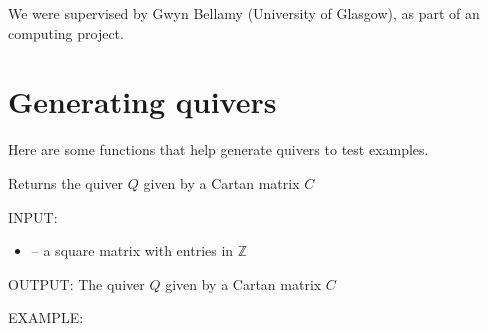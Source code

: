 \documentclass[letterpaper,10pt,english]{sphinxmanual}
\begin{document}
\sphinxAtStartPar
We were supervised by Gwyn Bellamy (University of Glasgow), as part of an  computing project.


\chapter{Generating quivers}
\label{\detokenize{index:generating-quivers}}
\sphinxAtStartPar
Here are some functions that help generate quivers to test examples.

\begin{fulllineitems}
\label{\detokenize{index:quivercombinatorics.quiver_from_cartan_matrix}}
\pysigstartsignatures
\pysiglinewithargsret
{}
{}
{}
\pysigstopsignatures
\sphinxAtStartPar
Returns the quiver \(Q\) given by a Cartan matrix \(C\)

\sphinxAtStartPar
INPUT:
\begin{itemize}
\item {} 
\sphinxAtStartPar
{} – a square matrix with entries in \(\mathbb{Z}\)

\end{itemize}

\sphinxAtStartPar
OUTPUT: The quiver \(Q\) given by a Cartan matrix \(C\)

\sphinxAtStartPar
EXAMPLE:

\begin{sphinxVerbatim}[commandchars=\\\{\}]
  
   \PYG{p}{[}\PYG{p}{[}  \PYG{p}{]} \PYG{p}{[}  \PYG{p}{]} \PYG{p}{[}  \PYG{p}{]}\PYG{p}{]}
 
       
\end{sphinxVerbatim}

\end{fulllineitems}
\end{document}
